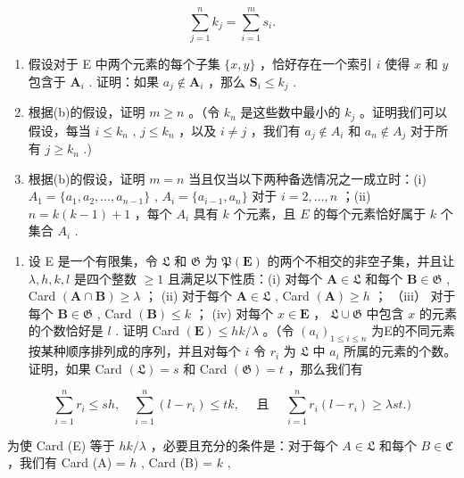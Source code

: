 \[
\sum_ {j = 1} ^ {n} k _ {j} = \sum_ {i = 1} ^ {m} s _ {i}.
\]

\begin{enumerate}
\def\labelenumi{(\alph{enumi})}
\setcounter{enumi}{1}
\item
  假设对于 E 中两个元素的每个子集 \(\{x, y\}\) ，恰好存在一个索引 \(i\) 使得 \(x\) 和 \(y\) 包含于 \(\mathbf{A}_i\) . 证明：如果 \(a_j \notin \mathbf{A}_i\) ，那么 \(\mathbf{S}_i \leqslant k_j\) .
\item
  根据(b)的假设，证明 \(m \geqslant n\) 。（令 \(k_n\) 是这些数中最小的 \(k_j\) 。证明我们可以假设，每当 \(i \leqslant k_n\) , \(j \leqslant k_n\) ，以及 \(i \neq j\) ，我们有 \(a_j \notin A_i\) 和 \(a_n \notin A_j\) 对于所有 \(j \geqslant k_n\) .)
\item
  根据(b)的假设，证明 \(m = n\) 当且仅当以下两种备选情况之一成立时：(i) \(A_1 = \{a_1, a_2, \ldots, a_{n-1}\}\) , \(A_i = \{a_{i-1}, a_n\}\) 对于 \(i = 2, \ldots, n\) ；(ii) \(n = k(k - 1) + 1\) ，每个 \(A_i\) 具有 \(k\) 个元素，且 \(E\) 的每个元素恰好属于 \(k\) 个集合 \(A_i\) .
\end{enumerate}

\begin{enumerate}
\def\labelenumi{\arabic{enumi}.}
\setcounter{enumi}{14}
\tightlist
\item
  设 E 是一个有限集，令 \(\mathfrak{L}\) 和 \(\mathfrak{G}\) 为 \(\mathfrak{P}(\mathbf{E})\) 的两个不相交的非空子集，并且让 \(\lambda, h, k, l\) 是四个整数 \(\geqslant 1\) 且满足以下性质：(i) 对每个 \(\mathbf{A} \in \mathfrak{L}\) 和每个 \(\mathbf{B} \in \mathfrak{G}\) , Card \((\mathbf{A} \cap \mathbf{B}) \geqslant \lambda\) ； (ii) 对于每个 \(\mathbf{A} \in \mathfrak{L}\) , Card \((\mathbf{A}) \geqslant h\) ； （iii） 对于每个 \(\mathbf{B} \in \mathfrak{G}\) , Card \((\mathbf{B}) \leqslant k\) ； (iv) 对每个 \(x \in \mathbf{E}\) ， \(\mathfrak{L} \cup \mathfrak{G}\) 中包含 \(x\) 的元素的个数恰好是 \(l\) . 证明 Card \((\mathbf{E}) \leqslant hk / \lambda\) 。（令 \((a_i)_{1 \leqslant i \leqslant n}\) 为E的不同元素按某种顺序排列成的序列，并且对每个 \(i\) 令 \(r_i\) 为 \(\mathfrak{L}\) 中 \(a_i\) 所属的元素的个数。证明，如果 Card \((\mathfrak{L}) = s\) 和 Card \((\mathfrak{G}) = t\) ，那么我们有
\end{enumerate}

\[
\sum_ {i = 1} ^ {n} r _ {i} \leqslant s h, \quad \sum_ {i = 1} ^ {n} (l - r _ {i}) \leqslant t k, \quad \text { 且 } \quad \sum_ {i = 1} ^ {n} r _ {i} (l - r _ {i}) \geqslant \lambda s t.)
\]

为使 Card (E) 等于 \(hk / \lambda\) ，必要且充分的条件是：对于每个 \(A \in \mathfrak{L}\) 和每个 \(B \in \mathfrak{C}\) ，我们有 Card (A) = \(h\) , Card (B) = \(k\) ,

